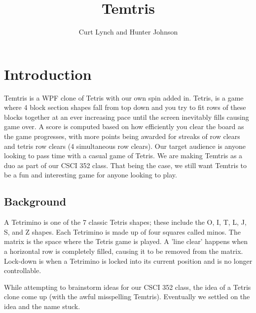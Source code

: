 \documentclass[10pt,conference,onecolumn,compsoc]{IEEEtran}
\begin{document}
\title{Temtris}
%
%


\author{Curt Lynch and Hunter Johnson}


\maketitle

\IEEEdisplaynontitleabstractindextext

\IEEEpeerreviewmaketitle

\section{Introduction}
Temtris is a WPF clone of Tetris with our own spin added in. Tetris, is a game where 4 block section shapes fall from top down and you try to fit rows of these blocks together at an ever increasing pace until the screen inevitably fills causing game over. A score is computed based on how efficiently you clear the board as the game progresses, with more points being awarded for streaks of row clears and tetris row clears (4 simultaneous row clears). Our target audience is anyone looking to pass time with a casual game of Tetris. We are making Temtris as a duo as part of our CSCI 352 class. That being the case, we still want Temtris to be a fun and interesting game for anyone looking to play.

\subsection{Background}
A Tetrimino is one of the 7 classic Tetris shapes; these include the O, I, T, L, J, S, and Z shapes. Each Tetrimino is made up of four squares called minos. The matrix is the space where the Tetris game is played. A 'line clear' happens when a horizontal row is completely filled, causing it to be removed from the matrix. Lock-down is when a Tetrimino is locked into its current position and is no longer controllable.

While attempting to brainstorm ideas for our CSCI 352 class, the idea of a Tetris clone come up (with the awful misspelling Temtris). Eventually we settled on the idea and the name stuck.
\end{document}
